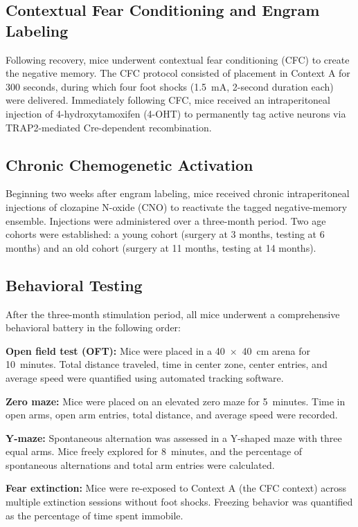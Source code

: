 \documentclass[11pt]{article}
\begin{document}
\subsection{Contextual Fear Conditioning and Engram Labeling}

Following recovery, mice underwent contextual fear conditioning (CFC) to create the negative memory. The CFC protocol consisted of placement in Context A for 300 seconds, during which four foot shocks (1.5~mA, 2-second duration each) were delivered. Immediately following CFC, mice received an intraperitoneal injection of 4-hydroxytamoxifen (4-OHT) to permanently tag active neurons via TRAP2-mediated Cre-dependent recombination.

\subsection{Chronic Chemogenetic Activation}

Beginning two weeks after engram labeling, mice received chronic intraperitoneal injections of clozapine N-oxide (CNO) to reactivate the tagged negative-memory ensemble. Injections were administered over a three-month period. Two age cohorts were established: a young cohort (surgery at 3 months, testing at 6 months) and an old cohort (surgery at 11 months, testing at 14 months).

\subsection{Behavioral Testing}

After the three-month stimulation period, all mice underwent a comprehensive behavioral battery in the following order:

\textbf{Open field test (OFT):} Mice were placed in a 40~$\times$~40~cm arena for 10~minutes. Total distance traveled, time in center zone, center entries, and average speed were quantified using automated tracking software.

\textbf{Zero maze:} Mice were placed on an elevated zero maze for 5~minutes. Time in open arms, open arm entries, total distance, and average speed were recorded.

\textbf{Y-maze:} Spontaneous alternation was assessed in a Y-shaped maze with three equal arms. Mice freely explored for 8~minutes, and the percentage of spontaneous alternations and total arm entries were calculated.

\textbf{Fear extinction:} Mice were re-exposed to Context A (the CFC context) across multiple extinction sessions without foot shocks. Freezing behavior was quantified as the percentage of time spent immobile.
\end{document}
